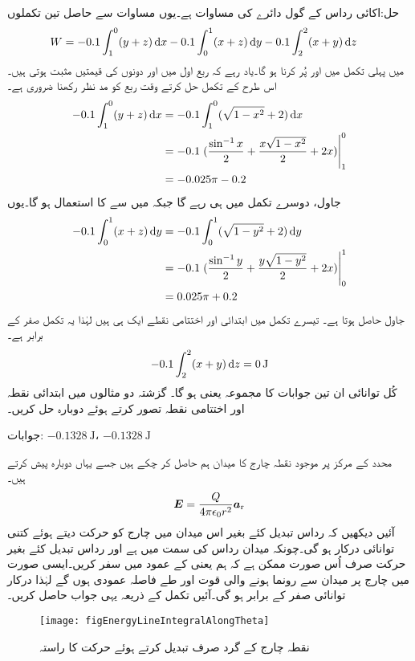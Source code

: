 حل:اکائی رداس کے گول دائرے کی مساوات  ہے۔یوں مساوات  سے حاصل تین تکملوں
\begin{align*}
W&=-0.1 \int_{1}^{0} (y+z) \dif x -0.1 \int_{0}^{1}(x+z) \dif y-0.1 \int_{2}^{2} (x+y) \dif z
\end{align*}
میں پہلی تکمل میں  اور  پُر کرنا ہو گا۔یاد رہے کہ ربع اول میں  اور  دونوں کی قیمتیں مثبت ہوتی ہیں۔اس طرح کے تکمل حل کرتے وقت ربع کو مد نظر رکھنا ضروری ہے۔ 
\begin{align*}
-0.1 \int_{1}^{0} (y+z) \dif x&=-0.1\int_{1}^{0} (\sqrt{1-x^2}+2) \dif x\\
&=-0.1\left.(\frac{\sin^{-1} x}{2}+\frac{x \sqrt{1-x^2}}{2}+2x)\right|_1^0\\
&=-0.025 \pi-0.2
\end{align*}
جاول، دوسرے تکمل میں  ہی رہے گا جبکہ  میں سے  کا استعمال ہو گا۔یوں
\begin{align*}
-0.1 \int_{0}^{1}(x+z) \dif y&=-0.1\int_{0}^{1} (\sqrt{1-y^2}+2) \dif y\\
&=-0.1\left.(\frac{\sin^{-1} y}{2}+\frac{y \sqrt{1-y^2}}{2}+2x)\right|_0^1\\
&=0.025 \pi+0.2
\end{align*}
جاول حاصل ہوتا ہے۔ تیسرے تکمل میں ابتدائی اور اختتامی نقطے ایک ہی ہیں لہٰذا یہ تکمل صفر کے برابر ہے۔ 
\begin{align*}
-0.1 \int_{2}^{2} (x+y)  \dif z =\SI{0}{\joule}
\end{align*}
کُل توانائی ان تین جوابات کا مجموعہ یعنی  ہو گا۔
گزشتہ دو مثالوں میں ابتدائی نقطہ  اور اختتامی نقطہ  تصور کرتے ہوئے دوبارہ حل کریں۔

جوابات:  $\SI{-0.1328}{\joule}$، $\SI{-0.1328}{\joule}$


محدد کے مرکز پر موجود نقطہ چارج  کا میدان ہم حاصل کر چکے ہیں جسے یہاں دوبارہ پیش کرتے ہیں۔
\begin{align}
{\ensuremath{{\boldsymbol{E}}}}=\frac{Q}{4 \pi \epsilon_0 r^2} {\boldsymbol{a}}_{\textup{r}}
\end{align}
آئیں دیکھیں کہ رداس تبدیل کئے بغیر اس میدان میں چارج  کو حرکت دیتے ہوئے کتنی توانائی درکار ہو گی۔چونکہ میدان رداس کی سمت میں ہے اور رداس تبدیل کئے بغیر حرکت صرف اُس صورت ممکن ہے کہ ہم  یعنی  کے عمود میں سفر کریں۔ایسی صورت میں چارج پر میدان سے رونما ہونے والی قوت اور طے فاصلہ عمودی ہوں گے لہٰذا درکار توانائی صفر کے برابر ہو گی۔آئیں تکمل کے ذریعہ یہی جواب حاصل کریں۔
\begin{figure}
\centering
\texttt{[image: figEnergyLineIntegralAlongTheta]}
\caption{نقطہ چارج کے گرد صرف  تبدیل کرتے ہوئے حرکت کا راستہ}
\label{شکل_توانائی_نقطہ_چارج_کے_گرد_تھیٹا_تبدیل_کرتے_راستہ}
\end{figure}

